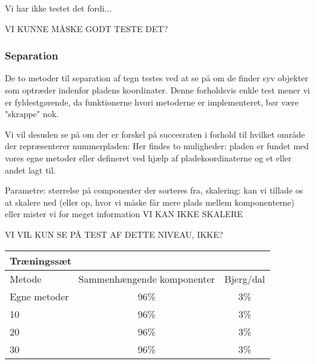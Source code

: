 Vi har ikke testet det fordi...

VI KUNNE MÅSKE GODT TESTE DET?

\subsubsection*{Separation}
De to metoder til separation af tegn testes ved at se på om de finder syv objekter som optræder indenfor pladens koordinater. Denne forholdsvis enkle test mener vi er fyldestgørende, da funktionerne hvori metoderne er implementeret, bør være "skrappe" nok.

Vi vil desuden se på om der er forskel på succesraten i forhold til hvilket område der repræsenterer nummerpladen: Her findes to muligheder: pladen er fundet med vores egne metoder eller defineret ved hjælp af pladekoordinaterne og et eller andet lagt til.

Parametre: størrelse på componenter der sorteres fra, skalering: kan vi tillade os at skalere ned (eller op, hvor vi måske får mere plads mellem komponenterne) eller mister vi for meget information VI KAN IKKE SKALERE

VI VIL KUN SE PÅ TEST AF DETTE NIVEAU, IKKE? 




\begin{tabular}{|l|c|c|}\hline
\multicolumn{3}{|l|}{Træningssæt} \\\hline
Metode & Sammenhængende komponenter & Bjerg/dal \\\hline
Egne metoder & 96\% & 3\% \\\hline
10 & 96\% & 3\% \\\hline
20 & 96\% & 3\% \\\hline
30 & 96\% & 3\% \\\hline \end{tabular}

